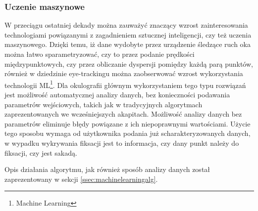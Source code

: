 \subsubsection{Uczenie maszynowe}
\label{ssec:machinelearning}
W przeciągu ostatniej dekady można zauważyć znaczący wzrost zainteresowania technologiami powiązanymi z zagadnieniem sztucznej inteligencji, czy też uczenia maszynowego. Dzięki temu, iż dane wydobyte przez urządzenie śledzące ruch oka można łatwo sparametryzować, czy to przez podanie prędkości międzypunktowych, czy przez obliczanie dyspersji pomiędzy każdą parą punktów, również w dziedzinie eye-trackingu można zaobserwować wzrost wykorzystania technologii ML\footnote{Machine Learning}. Dla okulografii głównym wykorzystaniem tego typu rozwiązań jest możliwość automatycznej analizy danych, bez konieczności podawania parametrów wejściowych, takich jak w tradycyjnych algorytmach zaprezentowanych we wcześniejszych akapitach. Możliwość analizy danych bez parametrów eliminuje błędy powiązane z ich niepoprawnymi wartościami. Użycie tego sposobu wymaga od użytkownika podania już scharakteryzowanych danych, w wypadku wykrywania fiksacji jest to informacja, czy dany punkt należy do fiksacji, czy jest sakadą.\par
Opis działania algorytmu, jak również sposób analizy danych został zaprezentowany w sekcji \ref{ssec:machinelearningalg}.

